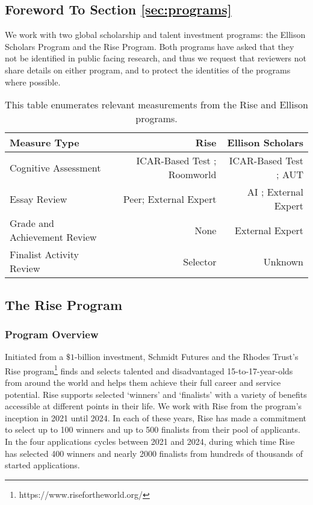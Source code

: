 \subsection{Foreword To Section \ref{sec:programs}}
We work with two global scholarship and talent investment programs: the Ellison Scholars Program and the Rise Program. Both programs have asked that they not be identified in public facing research, and thus we request that reviewers not share details on either program, and to protect the identities of the programs where possible.

\begin{table}[htbp]
    \centering
    \caption{This table enumerates relevant measurements from the Rise and Ellison programs.}
    \label{tab:measures}
    \begin{tabular}{l | r r}
        \toprule
        Measure Type & Rise & Ellison Scholars \\
        \midrule
        Cognitive Assessment & ICAR-Based Test \cite{condon2014international}; Roomworld \cite{Dumbalska_Bhatti_Ali_Summerfield_2023} & ICAR-Based Test \cite{condon2014international}; AUT \cite{guilford1967creativity,organisciak_beyond_2023} \\
        Essay Review & Peer; External Expert & AI \cite{xiao2024humanaicollaborativeessayscoring}; External Expert \\
        Grade and Achievement Review & None & External Expert \\
        Finalist Activity Review & Selector & Unknown \\
        \bottomrule
    \end{tabular}
  \end{table}
  
\subsection{The Rise Program}\label{ssec:rise}
\subsubsection{Program Overview}
Initiated from a $\$1$-billion investment, Schmidt Futures and the Rhodes Trust's Rise program\footnote{https://www.risefortheworld.org/} finds and selects talented and disadvantaged 15-to-17-year-olds from around the world and helps them achieve their full career and service potential. Rise supports selected `winners' and `finalists' with a variety of benefits accessible at different points in their life. We work with Rise from the program's inception in 2021 until 2024. In each of these years, Rise has made a commitment to select up to 100 winners and up to 500 finalists from their pool of applicants. In the four applications cycles between 2021 and 2024, during which time Rise has selected 400 winners and nearly 2000 finalists from hundreds of thousands of started applications.

